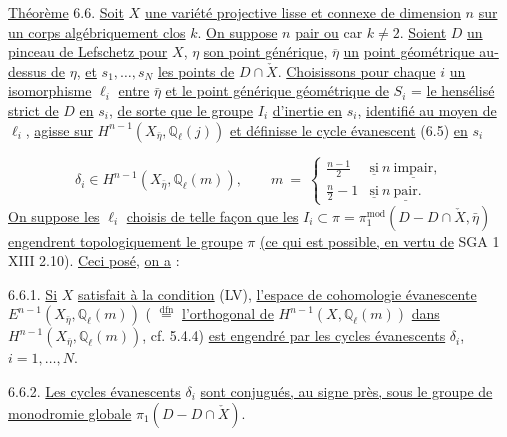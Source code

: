 \underline{Théorème} 6.6. \underline{Soit} $X$ \underline{une variété projective lisse et connexe de dimension} $n$ \underline{sur un corps algébriquement clos} $k$. \underline{On suppose} $n$ \underline{pair ou} car $k \neq 2$. \underline{Soient} $D$ \underline{un pinceau de Lefschetz pour} $X$, $\eta$ \underline{son point générique}, $\overline{\eta}$ \underline{un}
\underline{point géométrique au-dessus de} $\eta$, \underline{et} $s_{1},\ldots,s_{N}$ \underline{les points de} $D \cap \check{X}$. \underline{Choisissons pour chaque} $i$ \underline{un isomorphisme} $\ell_{i}$ \underline{entre} $\bar{\eta}$ \underline{et le point générique géométrique de} $S_{i}$ = \underline{le hensélisé strict de} $D$ \underline{en} $s_{i}$, \underline{de sorte que le groupe} $I_{i}$ \underline{d'inertie en} $s_i$, \underline{identifié au moyen de} $\ell_i$, \underline{agisse sur} $H^{n-1}(X_{\bar{\eta}},\mathbb{Q}_{\ell}(j))$ \underline{et définisse le cycle évanescent} (6.5) \underline{en} $s_{i}$

\begin{equation*}
\delta_{i} \in H^{n-1}(X_{\bar\eta},\mathbb{Q}_{\ell}(m)), \qquad m \ = \ \left\{ \begin{array}{ll} \frac{n-1}{2} & \underline{\mbox{si}}\ n\ \underline{\mbox{impair}}, \\[2ex] \frac{n}{2} - 1 & \underline{\mbox{si}}\ n\ \underline{\mbox{pair}}. \end{array} \right.
\end{equation*}
\underline{On suppose les} $\ell_{i}$ \underline{choisis de telle façon que les} $I_{i} \subset \pi = \pi_{1}^{\mathrm{mod}}(D-D \cap \check{X},\bar{\eta})$ \underline{engendrent topologiquement le groupe} $\pi$ \underline{(ce qui est possible, en vertu de} SGA 1 XIII 2.10). \underline{Ceci posé}, \underline{on a} :

6.6.1. \underline{Si} $X$ \underline{satisfait à la condition} (LV), \underline{l'espace de cohomologie évanescente} $E^{n-1}(X_{\bar{\eta}},\mathbb{Q}_{\ell}(m))$ ( $\stackrel{\mathrm{dfn}}{=}$ \underline{l'orthogonal de} $H^{n-1}(X,\mathbb{Q}_{\ell}(m))$ \underline{dans} $H^{n-1}(X_{\bar{\eta}},\mathbb{Q}_{\ell}(m))$, cf. 5.4.4) \underline{est engendré par les cycles évanescents} $\delta_{i}$, $i=1,\ldots,N$.

6.6.2. \underline{Les cycles évanescents} $\delta_{i}$ \underline{sont conjugués, au signe près, sous le groupe de monodromie globale} $\pi_{1}(D - D \cap \check{X})$.

